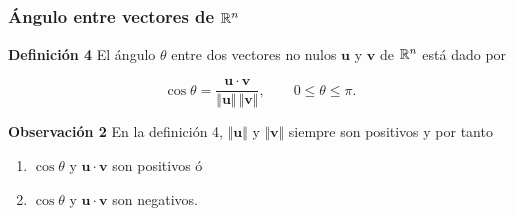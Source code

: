 
\subsection{}

\begin{frame}\frametitle{Ángulo entre vectores de $\mathbb{R}^n$}

\begin{defi}{\textbf{Definición 4}}\justifying
	\justifying
	El ángulo $\theta$ entre dos vectores no nulos $\mathbf{u}$ y $\mathbf{v}$ de $\mathbb{R}^n$ 
	está dado por
	
	\vspace{-0mm}
	\[
	\cos\theta = \frac{\mathbf{u}\cdot \mathbf{v}}{\Vert \mathbf{u}\Vert \, \Vert \mathbf{v}\Vert} , \qquad 0\leq \theta\leq \pi.
	\]
\end{defi}	

\begin{alertblock}{\textbf{Observación 2}}\justifying
	En la definición 4, $\Vert \mathbf{u}\Vert$ y $\Vert \mathbf{v}\Vert$ siempre son positivos y por tanto
	
	\vspace{-2mm}
	\begin{multicols}{2}
		\begin{enumerate}
			\item[\labelname{$a$}] $\cos\theta$ y $\mathbf{u}\cdot \mathbf{v}$ son positivos ó
			\item[\labelname{$b$}] $\cos\theta$ y $\mathbf{u}\cdot \mathbf{v}$ son negativos.\\
		\end{enumerate}
	\end{multicols}

\end{alertblock}

\vspace{-2mm}


\end{frame}
